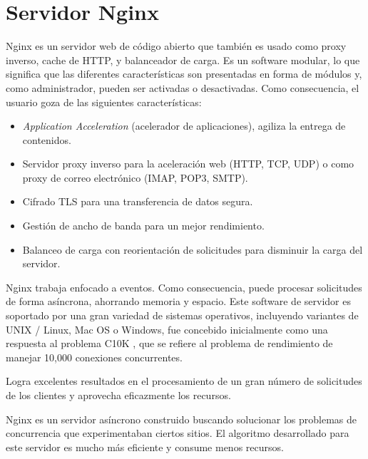 \section{Servidor Nginx}


Nginx \citep{WEBSITE:32} es un servidor web de código abierto que también es usado como proxy inverso, cache de HTTP, y balanceador de carga.  Es un software modular, lo que significa que las diferentes características son presentadas en forma de módulos y, como administrador, pueden ser activadas o desactivadas. Como consecuencia, el usuario goza de las siguientes características:

\begin{itemize}
	\item \textit{Application Acceleration} (acelerador de aplicaciones), agiliza la entrega de contenidos.
	
	\item Servidor proxy inverso para la aceleración web (HTTP, TCP, UDP) o como proxy de correo electrónico (IMAP, POP3, SMTP).
	
	\item Cifrado TLS para una transferencia de datos segura.
	
	\item Gestión de ancho de banda para un mejor rendimiento.
	
	\item Balanceo de carga con reorientación de solicitudes para disminuir la carga del servidor.
	
\end{itemize}


Nginx trabaja enfocado a eventos. Como consecuencia, puede procesar solicitudes de forma asíncrona, ahorrando memoria y espacio. Este software de servidor es soportado por una gran variedad de sistemas operativos, incluyendo variantes de UNIX / Linux, Mac OS o Windows, fue concebido inicialmente como una respuesta al problema C10K \citep{WEBSITE:33}, que se refiere al problema de rendimiento de manejar 10,000 conexiones concurrentes.

Logra excelentes resultados en el procesamiento de un gran número de solicitudes de los clientes y aprovecha eficazmente los recursos.

Nginx es un servidor asíncrono construido buscando solucionar los problemas de concurrencia que experimentaban ciertos sitios. El algoritmo desarrollado para este servidor es mucho más eficiente y consume menos recursos.

